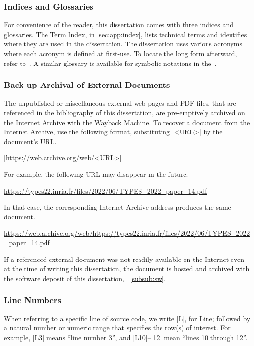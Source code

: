 \subsubsection{Indices and Glossaries}

For convenience of the reader, this dissertation comes with three indices and glossaries.
The Term Index, in \autoref{sec:app:index}, lists technical terms and identifies where they are used in the dissertation.
The dissertation uses various acronyms where each acronym is defined at first-use.
To locate the long form afterward, refer to~\nameref{\acronymtype}.
A similar glossary is available for symbolic notations in the~.

\subsubsection{Back-up Archival of External Documents}

The unpublished or miscellaneous external web pages and PDF files, that are referenced in the bibliography of this dissertation,
are pre-emptively archived on the Internet Archive with the Wayback Machine.
To recover a document from the Internet Archive, use the following format, substituting \pr|<URL>| by the document's URL\@.
\begin{center}
    \pr|https://web.archive.org/web/<URL>|
\end{center}
For example, the following URL may disappear in the future.
\begin{center}
    \url{https://types22.inria.fr/files/2022/06/TYPES_2022_paper_14.pdf}
\end{center}
In that case, the corresponding Internet Archive address produces the same document.
\begin{center}
    \url{https://web.archive.org/web/https://types22.inria.fr/files/2022/06/TYPES_2022_paper_14.pdf}
\end{center}

If a referenced external document was not readily available on the Internet even at the time of writing this dissertation,
the document is hosted and archived with the software deposit of this dissertation, \cf~\autoref{subsub:sw}.

\subsubsection{Line Numbers}
When referring to a specific line of source code,
we write \pr|L|, for \underline{L}ine;
followed by a natural number or numeric range that specifies the row(s) of interest.
For example, \pr|L3| means \enquote{line number 3}, and \pr|L10|--\pr|12| mean \enquote{lines 10 through 12}.
